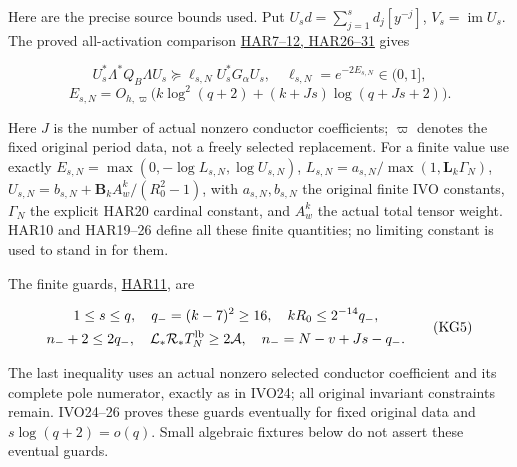 \documentclass[11pt]{article}
\begin{document}
Here are the precise source bounds used. Put \(U_sd=\sum_{j=1}^sd_j[y^{-j}]\), \(V_s=\operatorname{im}U_s\). The proved all-activation comparison \href{https://github.com/KokunoYumeto/zeta-function-research-reader/blob/360d3c1d798da434966d35f7e407fc59c14f234b/workbenches/splitzero-tandem/continuations/20260921-critical-inverse-activation/HARMONIC_PROOFS.md\#L78}{HAR7--12, HAR26--31} gives

\[
U_s^*\Lambda^*Q_B\Lambda U_s\succeq\ell_{s,N}U_s^*G_\alpha U_s,
\quad \ell_{s,N}=e^{-2E_{s,N}}\in(0,1],
\] \[
E_{s,N}=O_{h,\varpi}\bigl(k\log^2(q+2)+(k+Js)\log(q+Js+2)\bigr).
\tag{KG4}
\]

Here \(J\) is the number of actual nonzero conductor coefficients; \(\varpi\) denotes the fixed original period data, not a freely selected replacement. For a finite value use exactly \(E_{s,N}=\max(0,-\log L_{s,N},\log U_{s,N})\), \(L_{s,N}=a_{s,N}/\max(1,\mathbf L_k\Gamma_N)\), \(U_{s,N}=b_{s,N}+\mathbf B_kA_w^k/(R_0^2-1)\), with \(a_{s,N},b_{s,N}\) the original finite IVO constants, \(\Gamma_N\) the explicit HAR20 cardinal constant, and \(A_w^k\) the actual total tensor weight. HAR10 and HAR19--26 define all these finite quantities; no limiting constant is used to stand in for them.

The finite guards, \href{https://github.com/KokunoYumeto/zeta-function-research-reader/blob/360d3c1d798da434966d35f7e407fc59c14f234b/workbenches/splitzero-tandem/continuations/20260921-critical-inverse-activation/HARMONIC_PROOFS.md\#L112}{HAR11}, are

\[
\begin{gathered}
1\le s\le q,\quad q_-=(k-7)^2\ge16,\quad kR_0\le2^{-14}q_-,\\
n_-+2\le2q_-,\quad\mathcal L_*\mathcal R_*T_N^{\rm lb}\ge2\mathcal A,
\quad n_-=N-v+Js-q_-.
\end{gathered}
\tag{KG5}
\]

The last inequality uses an actual nonzero selected conductor coefficient and its complete pole numerator, exactly as in IVO24; all original invariant constraints remain. IVO24--26 proves these guards eventually for fixed original data and \(s\log(q+2)=o(q)\). Small algebraic fixtures below do not assert these eventual guards.
\end{document}
